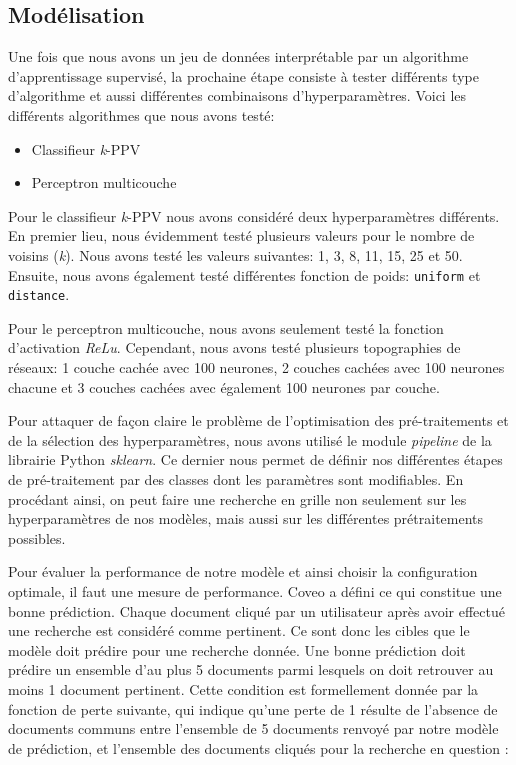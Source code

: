 \subsection{Modélisation}

Une fois que nous avons un jeu de données interprétable par un algorithme d'apprentissage supervisé, la prochaine étape consiste à tester différents type d'algorithme et aussi différentes combinaisons d'hyperparamètres. Voici les différents algorithmes que nous avons testé:

\begin{itemize}
  \item Classifieur \textit{k}-PPV
  \item Perceptron multicouche
\end{itemize}

Pour le classifieur \textit{k}-PPV nous avons considéré deux hyperparamètres différents. En premier lieu, nous évidemment testé plusieurs valeurs pour le nombre de voisins (\textit{k}). Nous avons testé les valeurs suivantes: 1, 3, 8, 11, 15, 25 et 50. Ensuite, nous avons également testé différentes fonction de poids: \texttt{uniform} et \texttt{distance}.

Pour le perceptron multicouche, nous avons seulement testé la fonction d'activation \textit{ReLu}. Cependant, nous avons testé plusieurs topographies de réseaux: 1 couche cachée avec 100 neurones, 2 couches cachées avec 100 neurones chacune et 3 couches cachées avec également 100 neurones par couche.
\break

Pour attaquer de façon claire le problème de l'optimisation des pré-traitements et de la sélection des hyperparamètres, nous avons utilisé le module \emph{pipeline} de la librairie Python \emph{sklearn}. Ce dernier nous permet de définir nos différentes étapes de pré-traitement par des classes dont les paramètres sont modifiables. En procédant ainsi, on peut faire une recherche en grille non seulement sur les hyperparamètres de nos modèles, mais aussi sur les différentes prétraitements possibles.
\break

Pour évaluer la performance de notre modèle et ainsi choisir la configuration optimale, il faut une mesure de performance. Coveo a défini ce qui constitue une bonne prédiction. Chaque document cliqué par un utilisateur après avoir effectué une recherche est considéré comme pertinent. Ce sont donc les cibles que le modèle doit prédire pour une recherche donnée. Une bonne prédiction doit prédire un ensemble d'au plus 5 documents parmi lesquels on doit retrouver au moins 1 document pertinent. Cette condition est formellement donnée par la fonction de perte suivante, qui indique qu'une perte de 1 résulte de l'absence de documents communs entre l'ensemble de 5 documents renvoyé par notre modèle de prédiction, et l'ensemble des documents cliqués pour la recherche en question :

